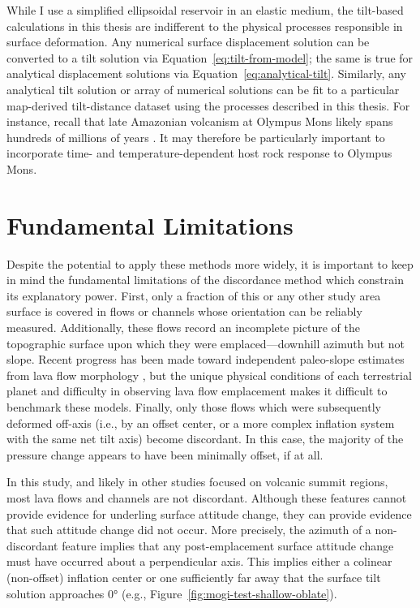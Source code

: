 While I use a simplified ellipsoidal reservoir in an elastic medium, the tilt-based calculations in this thesis are indifferent to the physical processes responsible in surface deformation. Any numerical surface displacement solution can be converted to a tilt solution via Equation~\eqref{eq:tilt-from-model}; the same is true for analytical displacement solutions via Equation~\eqref{eq:analytical-tilt}. Similarly, any analytical tilt solution or array of numerical solutions can be fit to a particular map-derived tilt-distance dataset using the processes described in this thesis. For instance, recall that late Amazonian volcanism at Olympus Mons likely spans hundreds of millions of years \parencite{neukum_recent_2004}. It may therefore be particularly important to incorporate time- and temperature-dependent host rock response \parencite[e.g.,][]{gregg_catastrophic_2012} to Olympus Mons.

\section{Fundamental Limitations}

Despite the potential to apply these methods more widely, it is important to keep in mind the fundamental limitations of the discordance method which constrain its explanatory power. First, only a fraction of this or any other study area surface is covered in flows or channels whose orientation can be reliably measured. Additionally, these flows record an incomplete picture of the topographic surface upon which they were emplaced---downhill azimuth but not slope. Recent progress has been made toward independent paleo-slope estimates from lava flow morphology \parencite{wadge_lobes_1991, peitersen_correlations_2000, peters_lava_2021}, but the unique physical conditions of each terrestrial planet and difficulty in observing lava flow emplacement makes it difficult to benchmark these models. Finally, only those flows which were subsequently deformed off-axis (i.e., by an offset center, or a more complex inflation system with the same net tilt axis) become discordant. In this case, the majority of the pressure change appears to have been minimally offset, if at all.

In this study, and likely in other studies focused on volcanic summit regions, most lava flows and channels are not discordant. Although these features cannot provide evidence for underling surface attitude change, they can provide evidence that such attitude change did not occur. More precisely, the azimuth of a non-discordant feature implies that any post-emplacement surface attitude change must have occurred about a perpendicular axis. This implies either a colinear (non-offset) inflation center or one sufficiently far away that the surface tilt solution approaches \ang{0} (e.g., Figure~\ref{fig:mogi-test-shallow-oblate}).


